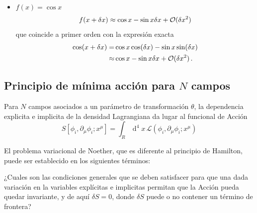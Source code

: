 \begin{frame}
\begin{itemize}
\item $f(x)=\cos x$
  \begin{align*}
    f(x+\delta x)\approx \cos x -\sin x \delta x + {\cal O}(\delta x^2)
  \end{align*}
  que coincide a primer orden con la expresión exacta
  \begin{align*}
    \cos(x+\delta x) =& \cos x \cos (\delta x) - \sin x \sin(\delta x) \\
    \approx & \cos x  - \sin x \delta x + {\cal O}(\delta x^2)\,.
  \end{align*}
\end{itemize}
\end{frame}

\begin{frame}
\section{Principio de mínima acción para $N$ campos}
\label{sec:ncampos}
  Para $N$ campos asociados a un parámetro de transformación $\theta$, la dependencia explicita e implicita de la densidad Lagrangiana da lugar al funcional de Acción
\begin{equation}
  S[\phi_i,\partial_\mu\phi_i;x^\mu]=\int_{R}\operatorname{d}^4x\,\mathcal{L}(\phi_i,\partial_\mu\phi_i;x^\mu)
\end{equation}


El problema variacional de Noether, que es diferente al principio de Hamilton, puede ser establecido en los siguientes términos:


\noindent
¿Cuales son las condiciones generales que se deben satisfacer para que una dada variación en la variables explícitas e implicitas permitan que la Acción pueda quedar invariante, y de aquí $\delta S=0$, donde $\delta S$ puede o no contener un término de frontera?


\end{frame}
